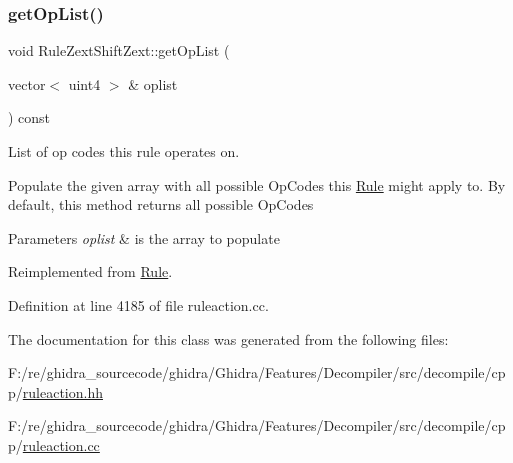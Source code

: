 \subsubsection{\texorpdfstring{getOpList()}{getOpList()}}
{\footnotesize\ttfamily void Rule\+Zext\+Shift\+Zext\+::get\+Op\+List (\begin{DoxyParamCaption}\item[{vector$<$ uint4 $>$ \&}]{oplist }\end{DoxyParamCaption}) const\hspace{0.3cm}{\ttfamily [virtual]}}



List of op codes this rule operates on. 

Populate the given array with all possible Op\+Codes this \mbox{\hyperlink{class_rule}{Rule}} might apply to. By default, this method returns all possible Op\+Codes 
\begin{DoxyParams}{Parameters}
{\em oplist} & is the array to populate \\
\hline
\end{DoxyParams}


Reimplemented from \mbox{\hyperlink{class_rule_a4023bfc7825de0ab866790551856d10e}{Rule}}.



Definition at line 4185 of file ruleaction.\+cc.



The documentation for this class was generated from the following files\+:\begin{DoxyCompactItemize}
\item 
F\+:/re/ghidra\+\_\+sourcecode/ghidra/\+Ghidra/\+Features/\+Decompiler/src/decompile/cpp/\mbox{\hyperlink{ruleaction_8hh}{ruleaction.\+hh}}\item 
F\+:/re/ghidra\+\_\+sourcecode/ghidra/\+Ghidra/\+Features/\+Decompiler/src/decompile/cpp/\mbox{\hyperlink{ruleaction_8cc}{ruleaction.\+cc}}\end{DoxyCompactItemize}
